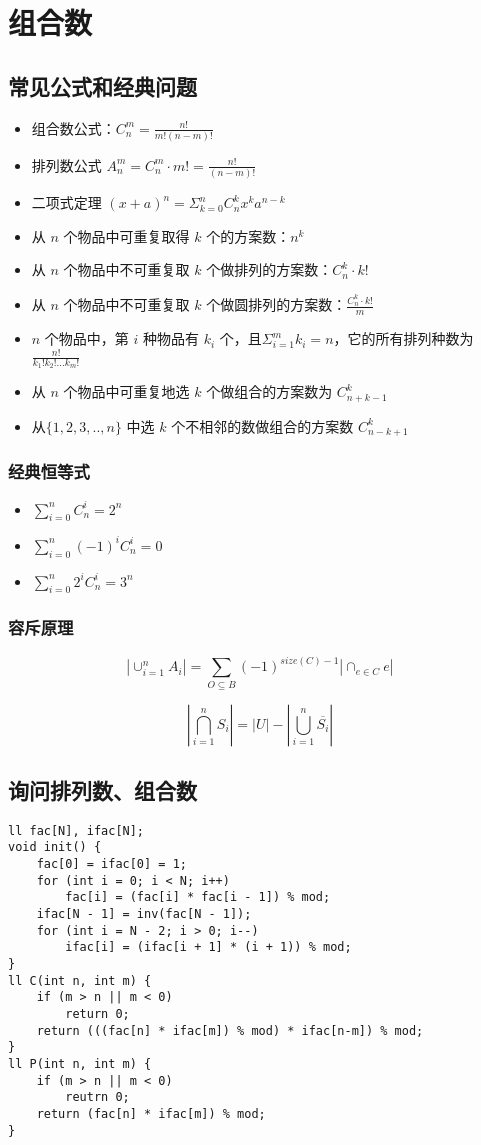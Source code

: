 \section{组合数}
\subsection{常见公式和经典问题}
\begin{itemize}
\item 组合数公式：$C_n^m = \frac{n!}{m!(n-m)!}$

\item 排列数公式 $A_n^m = C_n^m \cdot m! = \frac{n!}{(n-m)!}$

\item 二项式定理 $(x+a)^n = \Sigma_{k=0}^{n}C_n^kx^ka^{n-k}$

\item 从 $n$ 个物品中可重复取得 $k$ 个的方案数：$n^k$
\item 从 $n$ 个物品中不可重复取 $k$ 个做排列的方案数：$C_n^k \cdot k!$
\item 从 $n$ 个物品中不可重复取 $k$ 个做圆排列的方案数：$\frac{C_n^k \cdot k!}{m}$
\item $n$ 个物品中，第 $i$ 种物品有 $k_i$ 个，且$\Sigma_{i=1}^{m}k_i = n$，它的所有排列种数为 $\frac{n!}{k_1!k_2!...k_m!}$
\item 从 $n$ 个物品中可重复地选 $k$ 个做组合的方案数为 $C_{n+k-1}^k$
\item 从$\{1,2,3,..,n\}$ 中选 $k$ 个不相邻的数做组合的方案数 $C_{n-k+1}^k$
\end{itemize}
\subsubsection{经典恒等式}
\begin{itemize}
\item $\sum_{i=0}^{n}C_n^i = 2^n$
\item $\sum_{i=0}^{n}(-1)^iC_n^i = 0$
\item $\sum_{i=0}^{n}2^iC_n^i = 3^n$
\end{itemize}

\subsubsection{容斥原理}
$$|\cup^{n}_{i=1}A_i|=\sum_{O \subseteq B}(-1)^{size(C)-1}|\cap_{e\in C}e|$$

$$\left|\bigcap_{i=1}^{n}S_i\right|=|U|-\left|\bigcup_{i=1}^n\overline{S_i}\right|$$
\subsection{询问排列数、组合数}
\begin{verbatim}
ll fac[N], ifac[N];
void init() {
    fac[0] = ifac[0] = 1;
    for (int i = 0; i < N; i++)
        fac[i] = (fac[i] * fac[i - 1]) % mod;
    ifac[N - 1] = inv(fac[N - 1]);
    for (int i = N - 2; i > 0; i--)
        ifac[i] = (ifac[i + 1] * (i + 1)) % mod;
}
ll C(int n, int m) {
    if (m > n || m < 0)
        return 0;
    return (((fac[n] * ifac[m]) % mod) * ifac[n-m]) % mod;
}
ll P(int n, int m) {
    if (m > n || m < 0)
        reutrn 0;
    return (fac[n] * ifac[m]) % mod;
}
\end{verbatim}